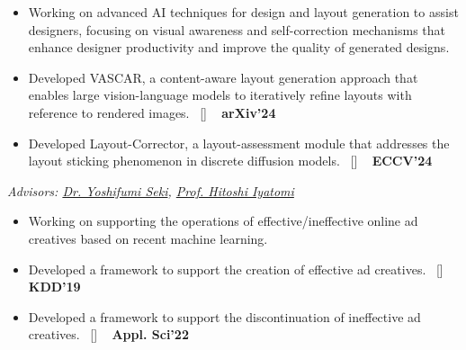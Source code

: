 
\begin{projects}
	{
		\begin{itemize}
			\setlength\itemsep{0.3em}
			\item Working on advanced AI techniques for design and layout generation to assist designers, focusing on visual awareness and self-correction mechanisms that enhance designer productivity and improve the quality of generated designs.
			\item Developed VASCAR, a content-aware layout generation approach that enables large vision-language models to iteratively refine layouts with reference to rendered images.~ [\href{https://arxiv.org/abs/2412.04237}{\small{\arxivSymbol}}] ~ {\small{\lbrack\textbf{{arXiv'24}}\rbrack}}
			\item Developed Layout-Corrector, a layout-assessment module that addresses the layout sticking phenomenon in discrete diffusion models.~ [\href{https://github.com/line/Layout-Corrector}{\small{\arxivSymbol}}] ~ {\small{\lbrack\textbf{{ECCV'24}}\rbrack}}
		\end{itemize}
	}
	{
		\textit{Advisors:  \href{https://scholar.google.com/citations?user=LoZ7VeYAAAAJ}{Dr. Yoshifumi Seki}, \href{https://iyatomi-lab.info/english/people/2013-6-8}{Prof. Hitoshi Iyatomi}}
	}
	{
		\begin{itemize}
			\setlength\itemsep{0.3em}
			\item Working on supporting the operations of effective/ineffective online ad creatives based on recent machine learning.
			\item Developed a framework to support the creation of effective ad creatives.~ [\href{https://github.com/shunk031/Multi-task-Conditional-Attention-Networks}{\small{\githubSymbol}}] ~ {\small{\lbrack\textbf{{KDD'19}}\rbrack}}
			\item Developed a framework to support the discontinuation of ineffective ad creatives.~ [\href{https://www.mdpi.com/2076-3417/12/7/3594}{\small{\websiteSymbol}}] ~ {\small{\lbrack\textbf{{Appl. Sci'22}}\rbrack}}
		\end{itemize}
	}

\end{projects}
